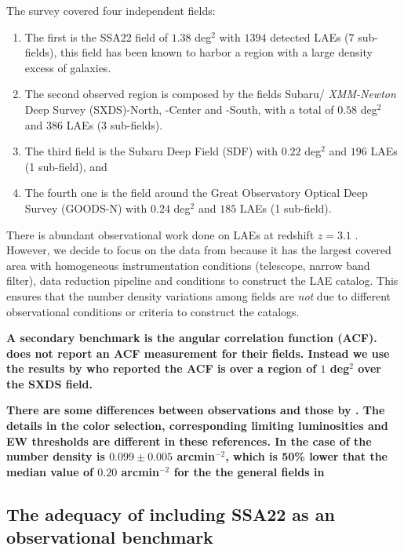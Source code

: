 \documentclass[usenatbib]{mn2e}
\begin{document}
The survey covered four independent fields:

\begin{enumerate}
\item The first is the SSA22
field of $1.38$ deg$^2$ with $1394$ detected LAEs (7 sub-fields), this
field has been known to harbor a region with a large density excess of
galaxies. 

\item The second observed region is composed by the fields Subaru/{\it
  XMM-Newton} Deep Survey (SXDS)-North, -Center and -South, with a
total of $0.58$ deg$^2$ and $386$ LAEs (3 sub-fields).

\item The third  field is the Subaru Deep Field (SDF) with $0.22$ deg$^2$ and
$196$ LAEs (1 sub-field), and 

\item The fourth one is the field around the Great Observatory
Optical Deep Survey  (GOODS-N) with $0.24$ deg$^2$ and $185$ LAEs (1
sub-field).  
\end{enumerate}
   

There is abundant observational work done on LAEs at redshift $z=3.1$
\citep{Kudritzki2000,Matsuda2005,Gawiser2007,Nilsson2007,Ouchi2008}.
However, we decide to focus on the data from \cite{Yamada2012} because
it has the largest covered area with homogeneous instrumentation
conditions (telescope, narrow band filter), data reduction pipeline
and conditions to construct the LAE catalog. This ensures that the
number density variations among fields are \emph{not} due to different
observational conditions or criteria to construct the catalogs.

{\bf A secondary benchmark is the angular correlation function
(ACF). \cite{Yamada2012} does not report an ACF measurement for
  their fields. Instead we use the results by   \cite{Ouchi2008} who
  reported the ACF is over a region of $1$ deg$^2$ over the SXDS
  field.  }

{\bf There are some differences between \cite{Ouchi2008} observations
  and those by \cite{Yamada2012}. The details in the color selection,
  corresponding limiting luminosities and EW thresholds are different
  in these references. In the case of
  \cite{Ouchi2008} the number density is $0.099\pm0.005$ arcmin$^{-2}$, which
  is 50\% lower that the median value of $0.20$ arcmin$^{-2}$ for the
  the general fields in \cite{Yamada2012}}



\subsection{The adequacy of including SSA22 as an observational benchmark}
\end{document}
